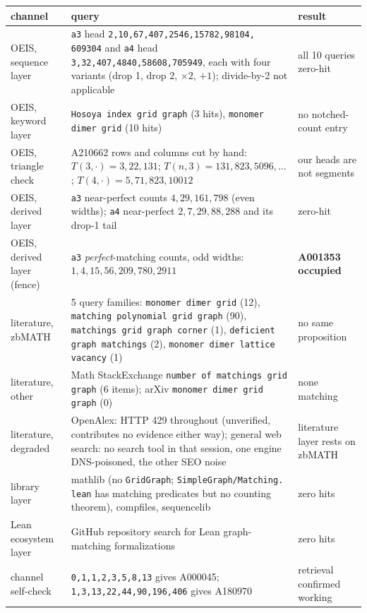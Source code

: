 \documentclass[11pt]{article}
\begin{document}
\begin{center}
\footnotesize
\setlength{\tabcolsep}{4pt}
\begin{tabular}{L{0.17\textwidth}L{0.52\textwidth}L{0.21\textwidth}}
\hline
channel & query & result \\
\hline
OEIS, sequence layer & \texttt{a3} head \texttt{2,10,67,407,2546,15782,98104,%
609304} and \texttt{a4} head \texttt{3,32,407,4840,58608,705949}, each with four
variants (drop 1, drop 2, $\times 2$, $+1$); divide-by-2 not applicable &
all 10 queries zero-hit \\
OEIS, keyword layer & \texttt{Hosoya index grid graph} (3 hits), \texttt{monomer
dimer grid} (10 hits) & no notched-count entry \\
OEIS, triangle check & A210662 rows and columns cut by hand: $T(3,\cdot) =
3,22,131$; $T(n,3) = 131,823,5096,\dots$; $T(4,\cdot) = 5,71,823,10012$
\cite{oeis-a210662} & our heads are not segments \\
OEIS, derived layer & \texttt{a3} near-perfect counts $4,29,161,798$ (even
widths); \texttt{a4} near-perfect $2,7,29,88,288$ and its drop-1 tail & zero-hit
\\
OEIS, derived layer (fence) & \texttt{a3} \emph{perfect}-matching counts, odd
widths: $1,4,15,56,209,780,2911$ & \textbf{A001353 occupied} \\
literature, zbMATH & 5 query families: \texttt{monomer dimer grid} (12),
\texttt{matching polynomial grid graph} (90), \texttt{matchings grid graph
corner} (1), \texttt{deficient graph matchings} (2), \texttt{monomer dimer
lattice vacancy} (1) & no same proposition \\
literature, other & Math StackExchange \texttt{number of matchings grid graph}
(6 items); arXiv \texttt{monomer dimer grid graph} (0) & none matching \\
literature, degraded & OpenAlex: HTTP 429 throughout (unverified, contributes no
evidence either way); general web search: no search tool in that session, one
engine DNS-poisoned, the other SEO noise & literature layer rests on zbMATH \\
library layer & mathlib (no \texttt{GridGraph}; \texttt{SimpleGraph/Matching.%
lean} has matching predicates but no counting theorem), compfiles, sequencelib &
zero hits \\
Lean ecosystem layer & GitHub repository search for Lean graph-matching
formalizations & zero hits \\
channel self-check & \texttt{0,1,1,2,3,5,8,13} gives A000045;
\texttt{1,3,13,22,44,90,196,406} gives A180970 & retrieval confirmed working \\
\hline
\end{tabular}
\end{center}
\end{document}
